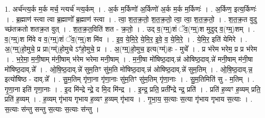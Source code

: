 \documentclass[17pt]{extarticle}
\begin{document}
1. अर्च॑न्त्य॒र्क म॒र्क मर्च॒ न्त्यर्च॑ न्त्य॒र्कम् । . अ॒र्क म॒र्किणो॑ अ॒र्किणो॑ अ॒र्क म॒र्क म॒र्किणः॑ । . अ॒र्किण॒ इत्य॒र्किणः॑ । . ब्र॒ह्माण॑ स्त्वा त्वा ब्र॒ह्माणो᳚ ब्र॒ह्माण॑ स्त्वा । . त्वा॒ श॒त॒क्र॒तो॒ श॒त॒क्र॒तो॒ त्वा॒ त्वा॒ श॒त॒क्र॒तो॒ । . श॒त॒क्र॒त वुदु च्छ॑तक्रतो शतक्र॒त वुत् । . श॒त॒क्र॒त॒विति॑ शत - क्र॒तो॒ । . उद् व॒(ग्म्॒)शं ॅव॒(ग्म्॒)श मुदुद् व॒(ग्म्॒)शम् । . व॒(ग्म्॒)श मि॑वे व व॒(ग्म्॒)शं ॅव॒(ग्म्॒)श मि॑व । . इ॒व॒ ये॒मि॒रे॒ ये॒मि॒र॒ इ॒वे॒ व॒ ये॒मि॒रे॒ । . ये॒मि॒र॒ इति॑ येमिरे । . अ॒(ग्म्॒)हो॒मुचे॒ प्र प्रा(ग्म्॑)हो॒मुचे ऽꣳ॑हो॒मुचे॒ प्र । . अ॒(ग्म्॒)हो॒मुच॒ इत्य(ग्म्॑)हः - मुचे᳚ । . प्र भ॑रेम भरेम॒ प्र प्र भ॑रेम । . भ॒रे॒मा॒ म॒नी॒षाम् म॑नी॒षाम् भ॑रेम भरेमा मनी॒षाम् । . म॒नी॒षा मो॑षिष्ठ॒दाव्.न्न॑ ओषिष्ठ॒दाव्.न्ने॑ मनी॒षाम् म॑नी॒षा मो॑षिष्ठ॒दाव्.न्ने᳚ । . ओ॒षि॒ष्ठ॒दाव्.न्ने॑ सुम॒तिꣳ सु॑म॒ति मो॑षिष्ठ॒दाव्.न्न॑ ओषिष्ठ॒दाव्.न्ने॑ सुम॒तिम् । . ओ॒षि॒ष्ठ॒दाव्.न्न॒ इत्यो॑षिष्ठ - दाव्.न्ने᳚ । . सु॒म॒तिम् गृ॑णा॒ना गृ॑णा॒नाः सु॑म॒तिꣳ सु॑म॒तिम् गृ॑णा॒नाः । . सु॒म॒तिमिति॑ सु - म॒तिम् । . गृ॒णा॒ना इति॑ गृणा॒नाः । . इ॒द मि॑न्द्रे न्द्रे॒ द मि॒द मि॑न्द्र । . इ॒न्द्र॒ प्रति॒ प्रती᳚न्द्रे न्द्र॒ प्रति॑ । . प्रति॑ ह॒व्यꣳ ह॒व्यम् प्रति॒ प्रति॑ ह॒व्यम् । . ह॒व्यम् गृ॑भाय गृभाय ह॒व्यꣳ ह॒व्यम् गृ॑भाय । . गृ॒भा॒य॒ स॒त्याः स॒त्या गृ॑भाय गृभाय स॒त्याः । . स॒त्याः स॑न्तु सन्तु स॒त्याः स॒त्याः स॑न्तु । \newline
\end{document}
